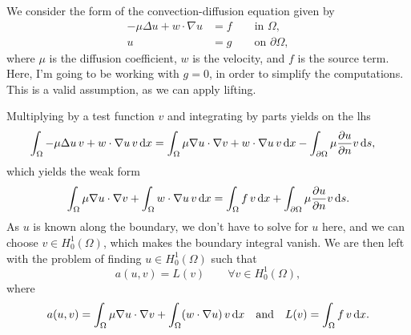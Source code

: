 We consider the form of the convection-diffusion equation given by
\begin{equation}
    \begin{split}
        -\mu \Delta u + w \cdot \nabla u &= f \qquad \text{in } \Omega,\\
        u &= g \qquad \text{on } \partial\Omega,
    \end{split}
\end{equation}
where $\mu$ is the diffusion coefficient, $w$ is the velocity, and $f$ is the source term.
Here, I'm going to be working with $g = 0$, in order to simplify the computations.
This is a valid assumption, as we can apply lifting.

Multiplying by a test function $v$ and integrating by parts yields on the lhs
\begin{align*}
    \int_{\Omega} -\mu \Delta u\, v + w \cdot \nabla u \, v \mathop{}\!\mathrm{d} x
    &= \int_\Omega \mu \nabla u \cdot \nabla v + w \cdot \nabla u\, v \mathop{}\!\mathrm{d} x - \int_{\partial\Omega} \mu \frac{\partial u}{\partial n} v \mathop{}\!\mathrm{d} s,
\end{align*}
which yields the weak form
\begin{equation}
    \int_{\Omega} \mu \nabla u \cdot \nabla v + \int_\Omega w \cdot \nabla u\, v \mathop{}\!\mathrm{d} x = \int_{\Omega} f \, v \mathop{}\!\mathrm{d} x + \int_{\partial\Omega} \mu \frac{\partial u}{\partial n} v \mathop{}\!\mathrm{d} s.
\end{equation}
As $u$ is known along the boundary, we don't have to solve for $u$ here, and we can choose $v \in H^1_0(\Omega)$, which makes the boundary integral vanish.
We are then left with the problem of finding $u \in H^1_0(\Omega)$ such that
\begin{equation}
    a(u, v) = L(v)\qquad \forall v \in H^1_0(\Omega),
\end{equation}
where
\begin{equation}
    a(u, v) = \int_{\Omega} \mu \nabla u \cdot \nabla v + \int_\Omega (w \cdot \nabla u) \, v \mathop{}\!\mathrm{d} x
    \quad\text{and}\quad
    L(v) = \int_{\Omega} f \, v \mathop{}\!\mathrm{d} x.
\end{equation}

